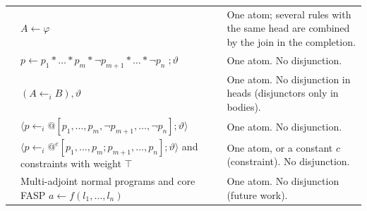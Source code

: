 {\begin{longtable}{@{}p{}p{}p{}@{}}
            \cite{LoyerS09}                       & $A\leftarrow\varphi$                                                                                                                                    & One atom; several rules with the same head are combined by the join in the completion.                                                                                                                                              \\
            \cite{MadridO12}                      & $p\leftarrow p_1\ast\dots\ast p_m\ast\neg p_{m+1}\ast\dots\ast\neg p_n\;;\vartheta$                                                                     & One atom. No disjunction.                                                                                                                                                                                                           \\
            \cite{MedinaOV01}                     & $(A\leftarrow_iB),\vartheta$                                                                                                                            & One atom. No disjunction in heads (disjunctors only in bodies).                                                                                                                                                                     \\
            \cite{CornejoLM18}                    & $\langle p\leftarrow_i@[p_1,\dots,p_m,\neg p_{m+1},\dots,\neg p_n];\vartheta\rangle$                                                                    & One atom. No disjunction.                                                                                                                                                                                                           \\
            \cite{CornejoLM20}                    & $\langle p\leftarrow_i@^e[p_1,\dots,p_m;p_{m+1},\dots,p_n];\vartheta\rangle$ and constraints with weight $\top$                                         & One atom, or a constant $c$ (constraint). No disjunction.                                                                                                                                                                           \\
            \cite{CornejoLM20math}                & Multi-adjoint normal programs and core FASP $a\leftarrow f(l_1,\dots,l_n)$                                                                              & One atom. No disjunction (future work).                                                                                                                                                                                             \\

\end{longtable}}
